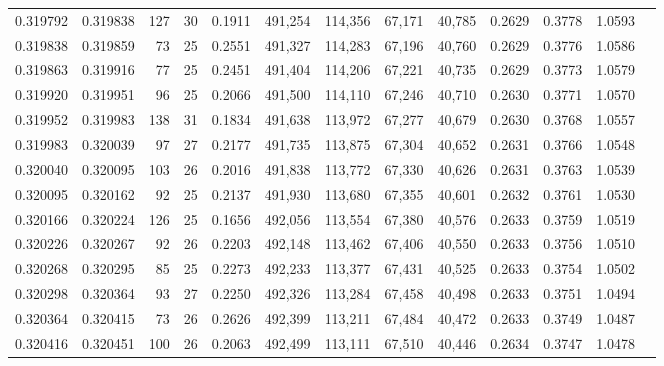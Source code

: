 \begin{tabular}{rrrrrrrrrrrrr}
0.319792 & 0.319838 &   127 &  30 &                                     0.1911 & 491,254 & 114,356 &  67,171 &  40,785 & 0.2629 & 0.3778 & 1.0593 \\
0.319838 & 0.319859 &    73 &  25 &                                     0.2551 & 491,327 & 114,283 &  67,196 &  40,760 & 0.2629 & 0.3776 & 1.0586 \\
0.319863 & 0.319916 &    77 &  25 &                                     0.2451 & 491,404 & 114,206 &  67,221 &  40,735 & 0.2629 & 0.3773 & 1.0579 \\
0.319920 & 0.319951 &    96 &  25 &                                     0.2066 & 491,500 & 114,110 &  67,246 &  40,710 & 0.2630 & 0.3771 & 1.0570 \\
0.319952 & 0.319983 &   138 &  31 &                                     0.1834 & 491,638 & 113,972 &  67,277 &  40,679 & 0.2630 & 0.3768 & 1.0557 \\
0.319983 & 0.320039 &    97 &  27 &                                     0.2177 & 491,735 & 113,875 &  67,304 &  40,652 & 0.2631 & 0.3766 & 1.0548 \\
0.320040 & 0.320095 &   103 &  26 &                                     0.2016 & 491,838 & 113,772 &  67,330 &  40,626 & 0.2631 & 0.3763 & 1.0539 \\
0.320095 & 0.320162 &    92 &  25 &                                     0.2137 & 491,930 & 113,680 &  67,355 &  40,601 & 0.2632 & 0.3761 & 1.0530 \\
0.320166 & 0.320224 &   126 &  25 &                                     0.1656 & 492,056 & 113,554 &  67,380 &  40,576 & 0.2633 & 0.3759 & 1.0519 \\
0.320226 & 0.320267 &    92 &  26 &                                     0.2203 & 492,148 & 113,462 &  67,406 &  40,550 & 0.2633 & 0.3756 & 1.0510 \\
0.320268 & 0.320295 &    85 &  25 &                                     0.2273 & 492,233 & 113,377 &  67,431 &  40,525 & 0.2633 & 0.3754 & 1.0502 \\
0.320298 & 0.320364 &    93 &  27 &                                     0.2250 & 492,326 & 113,284 &  67,458 &  40,498 & 0.2633 & 0.3751 & 1.0494 \\
0.320364 & 0.320415 &    73 &  26 &                                     0.2626 & 492,399 & 113,211 &  67,484 &  40,472 & 0.2633 & 0.3749 & 1.0487 \\
0.320416 & 0.320451 &   100 &  26 &                                     0.2063 & 492,499 & 113,111 &  67,510 &  40,446 & 0.2634 & 0.3747 & 1.0478 \\

\end{tabular}
